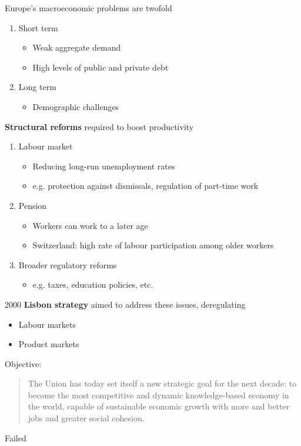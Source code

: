 \documentclass{beamer}
\begin{document}
\begin{frame}
 Europe's macroeconomic problems are twofold  
 \medskip
\begin{enumerate}
  \item Short term
  \begin{itemize}
    \item Weak aggregate demand
    \item High levels of public and private debt
  \end{itemize}
  \medskip
  \item Long term
  \begin{itemize}
    \item Demographic challenges  
  \end{itemize}    
\end{enumerate}
\end{frame}

\begin{frame}
  \textbf{Structural reforms} required to boost productivity
  \begin{enumerate}
  \item Labour market
  \begin{itemize}
    \item Reducing long-run unemployment rates
    \item e.g. protection against dismissals, regulation of part-time work
  \end{itemize}
  \item Pension
  \begin{itemize}
    \item Workers can work to a later age
    \item Switzerland: high rate of labour participation among older workers
  \end{itemize}
  \item Broader regulatory reforms
  \begin{itemize}
    \item e.g. taxes, education policies, etc. 
  \end{itemize}
\end{enumerate}
\end{frame}

\begin{frame}
  2000 \textbf{Lisbon strategy} aimed to address these issues, deregulating 
  \begin{itemize}
    \item Labour markets
    \item Product markets
  \end{itemize}
  \medskip
  Objective:
  \begin{quote}
    The Union has today set itself a new strategic goal for the next decade: to become the most competitive and dynamic knowledge-based economy in the world, capable of sustainable economic growth with more and better jobs and greater social cohesion.
  \end{quote}
  \medskip
  Failed  
\end{frame}
\end{document}
